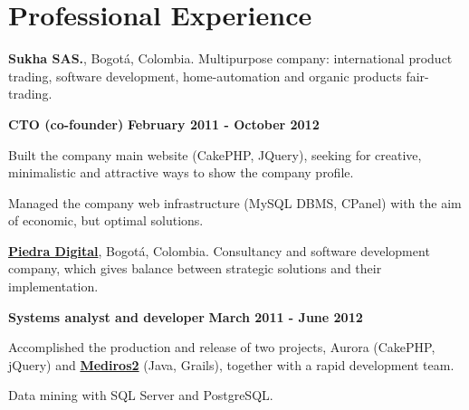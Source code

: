 \section{Professional Experience}
%
\textbf{Sukha SAS.}, Bogot\'a, Colombia.
Multipurpose company:
international product trading, software development, home-automation and organic
products fair-trading.
\begin{outerlist}
\item[] \textbf{CTO (co-founder)} \hfill \textbf{February 2011 - October
2012}
    \begin{innerlist}
\item Built the company main website (CakePHP, JQuery), seeking for creative,
minimalistic and attractive ways to show the company profile.
\item Managed the company web infrastructure (MySQL DBMS, CPanel) with the
aim of economic, but optimal solutions.
    \end{innerlist}
\end{outerlist}

\quarterblankline

\href{http://www.piedradigital.com/}{\textbf{Piedra Digital}}, Bogot\'a,
Colombia. Consultancy and software development company, which gives balance
between strategic solutions and their implementation.
\begin{outerlist}
\item[] \textbf{Systems analyst and developer} \hfill \textbf{March 2011 - June
2012}
    \begin{innerlist}
\item Accomplished the production and release of
two projects, Aurora (CakePHP, jQuery) and
\href{http://demo.100grados.co:8080/desempeno100/}{\textbf{Mediros2}} (Java,
Grails), together with a rapid development team.
\item Data mining with SQL Server and PostgreSQL.
    \end{innerlist}
\end{outerlist}

\quarterblankline



